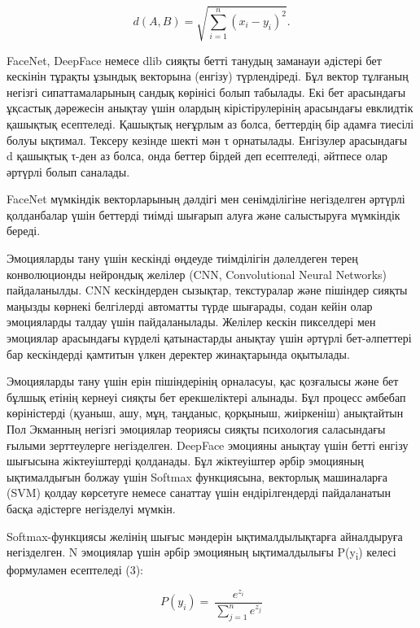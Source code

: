 \begin{multicols}{2}
\begin{equation}
d(A,B) = \sqrt{\sum_{i = 1}^{n}\left( x_{i} - y_{i} \right)^{2}}.
\end{equation}

FaceNet, DeepFace немесе dlib сияқты бетті танудың заманауи әдістері бет
кескінін тұрақты ұзындық векторына (енгізу) түрлендіреді. Бұл вектор
тұлғаның негізгі сипаттамаларының сандық көрінісі болып табылады. Екі
бет арасындағы ұқсастық дәрежесін анықтау үшін олардың кірістірулерінің
арасындағы евклидтік қашықтық есептеледі. Қашықтық неғұрлым аз болса,
беттердің бір адамға тиесілі болуы ықтимал. Тексеру кезінде шекті мән τ
орнатылады. Енгізулер арасындағы d қашықтық τ-ден аз болса, онда беттер
бірдей деп есептеледі, әйтпесе олар әртүрлі болып саналады.

FaceNet мүмкіндік векторларының дәлдігі мен сенімділігіне негізделген
әртүрлі қолданбалар үшін беттерді тиімді шығарып алуға және салыстыруға
мүмкіндік береді.

Эмоцияларды тану үшін кескінді өңдеуде тиімділігін дәлелдеген терең
конволюционды нейрондық желілер (CNN, Convolutional Neural Networks)
пайдаланылды. CNN кескіндерден сызықтар, текстуралар және пішіндер
сияқты маңызды көрнекі белгілерді автоматты түрде шығарады, содан кейін
олар эмоцияларды талдау үшін пайдаланылады. Желілер кескін пикселдері
мен эмоциялар арасындағы күрделі қатынастарды анықтау үшін әртүрлі
бет-әлпеттері бар кескіндерді қамтитын үлкен деректер жинақтарында
оқытылады.

Эмоцияларды тану үшін ерін пішіндерінің орналасуы, қас қозғалысы және
бет бұлшық етінің кернеуі сияқты бет ерекшеліктері алынады. Бұл процесс
әмбебап көріністерді (қуаныш, ашу, мұң, таңданыс, қорқыныш, жиіркеніш)
анықтайтын Пол Экманның негізгі эмоциялар теориясы сияқты психология
саласындағы ғылыми зерттеулерге негізделген. DeepFace эмоцияны анықтау
үшін бетті енгізу шығысына жіктеуіштерді қолданады. Бұл жіктеуіштер
әрбір эмоцияның ықтималдығын болжау үшін Softmax функциясына, векторлық
машиналарға (SVM) қолдау көрсетуге немесе санаттау үшін ендірілгендерді
пайдаланатын басқа әдістерге негізделуі мүмкін.

Softmax-функциясы желінің шығыс мәндерін ықтималдылықтарға айналдыруға
негізделген. N эмоциялар үшін әрбір эмоцияның ықтималдылығы
P(y\textsubscript{i}) келесі формуламен есептеледі (3):

\begin{equation}
P\left( y_{i} \right) = \ \frac{e^{z_{i}}}{\sum_{j = 1}^{n}e^{z_{j}}}
\end{equation}


\end{multicols}
